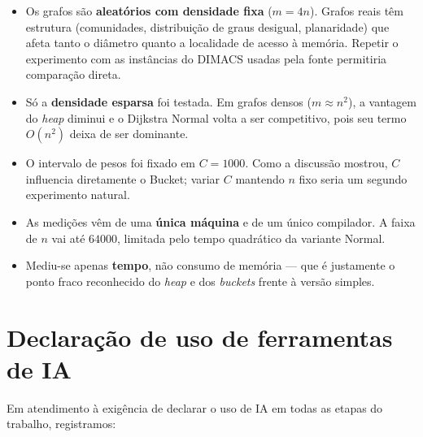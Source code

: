\documentclass[12pt,a4paper]{article}
\begin{document}
\begin{itemize}
  \item Os grafos são \textbf{aleatórios com densidade fixa} ($m = 4n$).
        Grafos reais têm estrutura (comunidades, distribuição de graus
        desigual, planaridade) que afeta tanto o diâmetro quanto a localidade
        de acesso à memória. Repetir o experimento com as instâncias do
        DIMACS usadas pela fonte permitiria comparação direta.
  \item Só a \textbf{densidade esparsa} foi testada. Em grafos densos
        ($m \approx n^2$), a vantagem do \emph{heap} diminui e o Dijkstra
        Normal volta a ser competitivo, pois seu termo $O(n^2)$ deixa de ser
        dominante.
  \item O intervalo de pesos foi fixado em $C = 1000$. Como a discussão
        mostrou, $C$ influencia diretamente o Bucket; variar $C$ mantendo $n$
        fixo seria um segundo experimento natural.
  \item As medições vêm de uma \textbf{única máquina} e de um único
        compilador. A faixa de $n$ vai até $64000$, limitada pelo tempo
        quadrático da variante Normal.
  \item Mediu-se apenas \textbf{tempo}, não consumo de memória --- que é
        justamente o ponto fraco reconhecido do \emph{heap} e dos
        \emph{buckets} frente à versão simples.
\end{itemize}

\section*{Declaração de uso de ferramentas de IA}

Em atendimento à exigência de declarar o uso de IA em todas as etapas do
trabalho, registramos:
\end{document}
